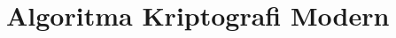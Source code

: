 \documentclass[../main.tex]{subfiles}
\begin{document}
\chapter{Algoritma Kriptografi Modern}
\end{document}
